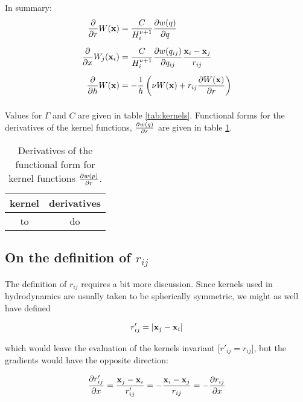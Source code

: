 In summary:
\begin{align*}
	\frac{\partial}{\partial r} W (\mathbf{x}) 
			&= \frac{C}{H_i^{\nu + 1}} \frac{\partial w(q)}{\partial q} \\[.5em]
	\frac{\partial}{\partial x} W_j(\mathbf{x}_i) 
			&= \frac{C}{H_i^{\nu + 1}} \frac{\partial w(q_{ij})}{\partial q_{ij}}  \frac{\mathbf{x}_i - \mathbf{x}_j}{r_{ij}}\\[.5em]
 	\frac{\partial}{\partial h} W(\mathbf{x}) 
 			&= - \frac{1}{h} \left( \nu W(\mathbf{x}) + r_{ij}  \frac{\partial W(\mathbf{x})}{\partial r} \right) \\[.5em]
\end{align*}


Values for $\Gamma$ and $C$ are given in table \ref{tab:kernels}.
Functional forms for the derivatives of the kernel functions, $\frac{\partial w(q)}{\partial r}$ are given in table \ref{tab:kernel-derivatives}.


\begin{table}
\caption{
	\label{tab:kernel-derivatives}
	Derivatives of the functional form for kernel functions $\frac{\partial w(p)}{\partial r}$.
}
\centering

\begin{tabular}{|c|c|}
\hline 
kernel & derivatives \\ 
\hline 
to & do \\ 
\hline 
\end{tabular} 
\end{table}









\subsection{On the definition of $r_{ij}$}


The definition of $r_{ij}$ requires a bit more discussion.
Since kernels used in hydrodynamics are usually taken to be spherically symmetric, we might as well have defined

\begin{align*}
r'_{ij} = |\mathbf{x}_j - \mathbf{x}_i |
\end{align*}

which would leave the evaluation of the kernels invariant [$r'_{ij} = r_{ij}$], but the gradients would have the opposite direction:

\begin{align*}
\frac{\partial r'_{ij}}{\partial x}	
=   \frac{\mathbf{x}_j - \mathbf{x}_i}{r'_{ij}} 
= - \frac{\mathbf{x}_i - \mathbf{x}_j}{r_{ij}}
= - \frac{\partial r_{ij}}{\partial x}
\end{align*}

